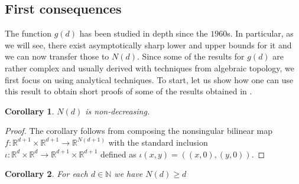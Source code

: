 \documentclass[11pt, a4paper, reqno]{elsarticle}
\newtheorem{corollary}{Corollary}[theorem]
\theoremstyle{definition}
\theoremstyle{remark}
\begin{document}
 \subsection{First consequences}
The function $g(d)$ has been studied in depth
since the $1960$s.
In particular, as we will see, there exist asymptotically
sharp lower and upper bounds for it and we can now
transfer those to $N(d)$. Since some
of the results for $g(d)$ are
rather complex and usually derived with 
techniques from algebraic topology, we first focus on
using analytical techniques.
To start, let us show how one can use this result
to obtain short proofs of some of the results obtained
in \cite{Chipot2021OnType}.
\begin{corollary} $N(d)$ is non-decreasing.
\end{corollary} 
\begin{proof}
The corollary follows from composing the nonsingular bilinear map 
$f\colon\mathbb{R}^{d+1}\times \mathbb{R}^{d+1}\to \mathbb{R}^{N(d+1)}$
with the standard inclusion
$\iota\colon \mathbb{R}^d\times \mathbb{R}^d\to \mathbb{R}^{d+1}\times \mathbb{R}^{d+1}$
defined as $\iota(x,y)=((x,0),(y,0))$.
\end{proof}
\begin{corollary}
For each $d\in\mathbb{N}$ we have
$N(d)\ge d$
\end{corollary}
\end{document}
